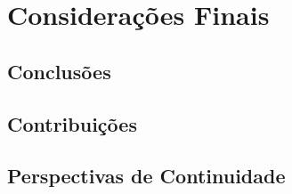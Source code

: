 \chapter{Considerações Finais} \label{cap:consideracoes}

\section{Conclusões}
\label{sec:conclusoes}







\section{Contribuições}
\label{sec:contribuicoes}





\section{Perspectivas de Continuidade}






